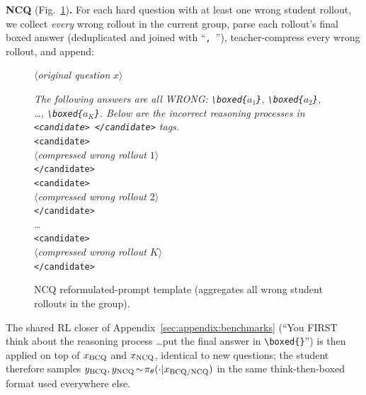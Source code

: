 \documentclass{llmxive}
\begin{document}
\noindent\textbf{NCQ} (Fig.~\ref{fig:prompt-ncq})\textbf{.} For each hard question with at least one wrong student rollout, we collect \emph{every} wrong rollout in the current group, parse each rollout's final boxed answer (deduplicated and joined with ``\texttt{, }''), teacher-compress every wrong rollout, and append:
\begin{figure}[!htbp]
\begin{prompttemplatefig}
\small
$\langle$\emph{original question} $x$$\rangle$

\emph{The following answers are all WRONG: \texttt{\textbackslash boxed\{}$a_1$\texttt{\}}, \texttt{\textbackslash boxed\{}$a_2$\texttt{\}}, \dots, \texttt{\textbackslash boxed\{}$a_K$\texttt{\}}. Below are the incorrect reasoning processes in \texttt{<candidate> </candidate>} tags.}\\
\texttt{<candidate>}\\
$\langle$\emph{compressed wrong rollout $1$}$\rangle$\\
\texttt{</candidate>}\\
\texttt{<candidate>}\\
$\langle$\emph{compressed wrong rollout $2$}$\rangle$\\
\texttt{</candidate>}\\
\dots\\
\texttt{<candidate>}\\
$\langle$\emph{compressed wrong rollout $K$}$\rangle$\\
\texttt{</candidate>}
\end{prompttemplatefig}
\caption{NCQ reformulated-prompt template (aggregates all wrong student rollouts in the group).}
\label{fig:prompt-ncq}
\end{figure}
The shared RL closer of Appendix~\ref{sec:appendix:benchmarks} (``You FIRST think about the reasoning process \dots put the final answer in \texttt{\textbackslash boxed\{\}}'') is then applied on top of $x_{\rm BCQ}$ and $x_{\rm NCQ}$, identical to new questions; the student therefore samples $y_{\rm BCQ},y_{\rm NCQ}\!\sim\!\pi_\theta(\cdot|x_{\rm BCQ/NCQ})$ in the same think-then-boxed format used everywhere else.
\end{document}
